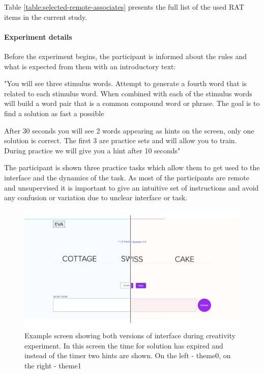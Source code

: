  		Table \ref{table:selected-remote-associates} presents the full list of the used RAT items in the current study. 
		
		\paragraph{Experiment details}
		
		Before the experiment begins, the participant is informed about the rules and what is expected from them with an introductory text:
		
		\begin{displayquote}
			"You will see three stimulus words. Attempt to generate a fourth word that is related to each stimulus word. When combined with each of the stimulus words will build a word pair that is a common compound word or phrase. The goal is to find a solution as fast a possible
			
			After 30 seconds you will see 2 words appearing as hints on the screen, only one solution is correct.
			The first 3 are practice sets and will allow you to train. During practice we will give you a hint after 10 seconds"
		\end{displayquote}
	
		The participant is shown three practice tasks which allow them to get used to the interface and the dynamics of the task. As most of the participants are remote and unsupervised it is important to give an intuitive set of instructions and avoid any confusion or variation due to unclear interface or task.
		
		\begin{figure}[h]
			\centering
			\includegraphics[width=1\linewidth]{graphics/creativity-versions}
			\caption{Example screen showing both versions of interface during creativity experiment. In this screen the time for solution has expired and instead of the timer two hints are shown. On the left - theme0, on the right - theme1}
			\label{fig:creativity-versions}
		\end{figure}
	
